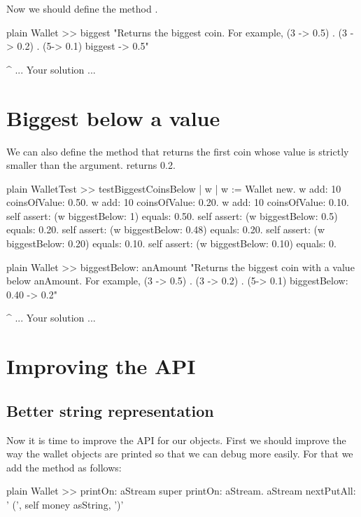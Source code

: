 \documentclass[10pt,twoside,english]{_support/latex/sbabook/sbabook}
\begin{document}
Now we should define the method .

\begin{displaycode}{plain}
Wallet >> biggest
	"Returns the biggest coin. For example, {(3 -> 0.5) . (3 -> 0.2) . (5-> 0.1)} biggest -> 0.5"

	^ ... Your solution ...
\end{displaycode}
\section{Biggest below a value}
We can also define the method  that returns the first coin whose value is strictly smaller than the argument.  returns 0.2.
	

\begin{displaycode}{plain}
WalletTest >> testBiggestCoinsBelow
	| w |
	w := Wallet new.
	w add: 10 coinsOfValue: 0.50.
	w add: 10 coinsOfValue: 0.20.
	w add: 10 coinsOfValue: 0.10.
	self assert: (w biggestBelow: 1) equals: 0.50.
	self assert: (w biggestBelow: 0.5) equals: 0.20.
	self assert: (w biggestBelow: 0.48) equals: 0.20.
	self assert: (w biggestBelow: 0.20) equals: 0.10.
	self assert: (w biggestBelow: 0.10) equals: 0.
\end{displaycode}

\begin{displaycode}{plain}
Wallet >> biggestBelow: anAmount
	"Returns the biggest coin with a value below anAmount. For example, {(3 -> 0.5) . (3 -> 0.2) . (5-> 0.1)} biggestBelow: 0.40 -> 0.2"
	
	^ ... Your solution ...
\end{displaycode}
\section{Improving the API}\subsection{Better string representation}
Now it is time to improve the API for our objects. First we should improve the way the wallet objects are printed so that we can debug more easily. For that we add the method  as follows:

\begin{displaycode}{plain}
Wallet >> printOn: aStream
	super printOn: aStream.
	aStream nextPutAll: ' (', self money asString, ')'
\end{displaycode}
\end{document}

